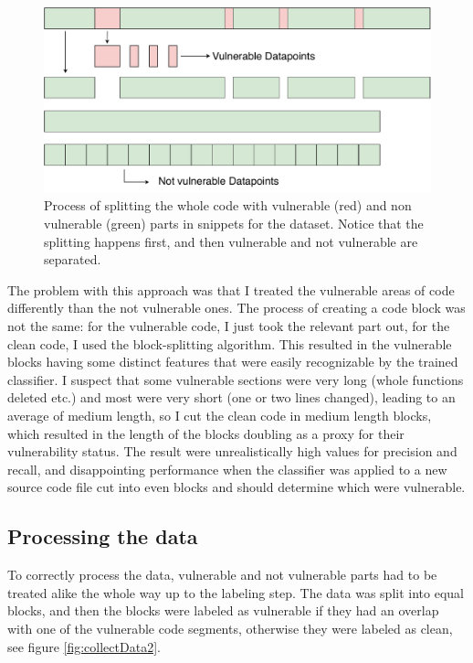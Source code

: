 \documentclass[
a4paper,
pagesize,
pdftex,
12pt,
twoside, %
BCOR=5mm, %
ngerman,
fleqn,
final,
]{scrartcl}
\begin{document}
	\begin{figure}[ht]
		\centering
		\includegraphics[width=0.8\linewidth]{img/collectData1}
		\caption{Process of splitting the whole code with vulnerable (red) and non vulnerable (green) parts in snippets for the dataset. Notice that the splitting happens first, and then vulnerable and not vulnerable are separated.}
		\label{fig:collectData1}
	\end{figure}
	
	The problem with this approach was that I treated the vulnerable areas of code differently than the not vulnerable ones. The process of creating a code block was not the same: for the vulnerable code, I just took the relevant part out, for the clean code, I used the block-splitting algorithm. This resulted in the vulnerable blocks having some distinct features that were easily recognizable by the trained classifier. I suspect that some vulnerable sections were very long (whole functions deleted etc.) and most were very short (one or two lines changed), leading to an average of medium length, so I cut the clean code in medium length blocks, which resulted in the length of the blocks doubling as a proxy for their vulnerability status. The result were unrealistically high values for precision and recall, and disappointing performance when the classifier was applied to a new source code file cut into even blocks and should determine which were vulnerable.\\
	
	\subsection{Processing the data}\label{Processing}
	To correctly process the data, vulnerable and not vulnerable parts had to be treated alike the whole way up to the labeling step. The data was split into equal blocks, and then the blocks were labeled as vulnerable if they had an overlap with one of the vulnerable code segments, otherwise they were labeled as clean, see figure \ref{fig:collectData2}.
	
\end{document}

